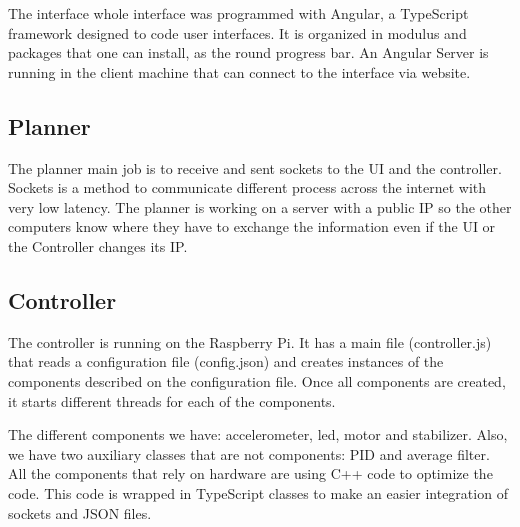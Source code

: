 The interface whole interface was programmed with Angular, a TypeScript framework designed to code user interfaces.
It is organized in modulus and packages that one can install, as the round progress bar. An Angular Server is 
running in the client machine that can connect to the interface via website.

\subsection{Planner}
The planner main job is to receive and sent sockets to the UI and the controller. Sockets is a method to communicate
different process across the internet with very low latency. The planner is working on a server with a public IP
so the other computers know where they have to exchange the information even if the UI or the Controller changes its IP.

\subsection{Controller}
The controller is running on the Raspberry Pi. It has a main file (controller.js) that reads
a configuration file (config.json) and creates instances of the components described on the configuration file.
Once all components are created, it starts different threads for each of the components.

The different components we have: accelerometer, led, motor and stabilizer. Also, we have two auxiliary classes that are
not components: PID and average filter. All the components that rely on hardware are using C++ code to optimize
the code. This code is wrapped in TypeScript classes to make an easier integration of sockets and JSON files.
